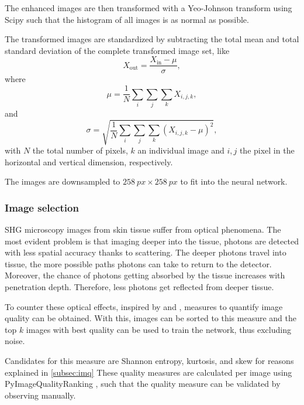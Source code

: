The enhanced images are then transformed with a Yeo-Johnson transform using Scipy \cite{2020SciPy-NMeth} such that the histogram of all images is as normal as possible.

The transformed images are standardized by subtracting the total mean and total standard deviation of the complete transformed image set, like
\begin{equation}
    X_\mathrm{out} = \frac{X_\mathrm{in} - \mu}{\sigma},
\end{equation}
where
\begin{equation}
    \mu = \frac{1}{N} \sum_i \sum_j \sum_k X_{i,j,k},
\end{equation}
and
\begin{equation}
    \sigma = \sqrt{\frac{1}{N} \sum_i \sum_j \sum_k \left(X_{i,j,k} - \mu\right)^2},
\end{equation}
with $N$ the total number of pixels, $k$ an individual image and $i,j$ the pixel in the horizontal and vertical dimension, respectively.

The images are downsampled to $\qty{258}{px}\times \qty{258}{px}$ to fit into the neural network.

\subsubsection{Image selection}
SHG microscopy images from skin tissue suffer from optical phenomena.
The most evident problem is that imaging deeper into the tissue, photons are detected with less spatial accuracy thanks to scattering.
The deeper photons travel into tissue, the more possible paths photons can take to return to the detector.
Moreover, the chance of photons getting absorbed by the tissue increases with penetration depth.
Therefore, less photons get reflected from deeper tissue.

To counter these optical effects, inspired by \textcite{Koho2016} and \textcite{Blokker2022}, measures to quantify image quality can be obtained.
With this, images can be sorted to this measure and the top $k$ images with best quality can be used to train the network, thus excluding noise.

Candidates for this measure are Shannon entropy, kurtosis, and skew for reasons explained in \ref{subsec:imq}
These quality measures are calculated per image using PyImageQualityRanking \cite{Koho2016}, such that the quality measure can be validated by observing manually.

